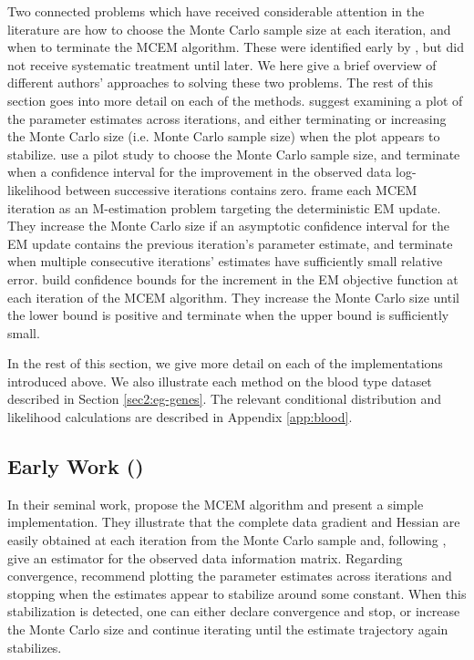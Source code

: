 \documentclass[11pt, oneside]{article}   	%
\begin{document}
Two connected problems which have received considerable attention in the literature are how to choose the Monte Carlo sample size at each iteration, and when to terminate the MCEM algorithm. These were identified early by \citet{Wei90}, but did not receive systematic treatment until later. We here give a brief overview of different authors' approaches to solving these two problems. The rest of this section goes into more detail on each of the methods. \citet{Wei90} suggest examining a plot of the parameter estimates across iterations, and either terminating or increasing the Monte Carlo size (i.e. Monte Carlo sample size) when the plot appears to stabilize. \citet{Cha95} use a pilot study to choose the Monte Carlo sample size, and terminate when a confidence interval for the improvement in the observed data log-likelihood between successive iterations contains zero. \citet{Boo99} frame each MCEM iteration as an M-estimation problem targeting the deterministic EM update. They increase the Monte Carlo size if an asymptotic confidence interval for the EM update contains the previous iteration's parameter estimate, and terminate when multiple consecutive iterations' estimates have sufficiently small relative error. \citet{Caf05} build confidence bounds for the increment in the EM objective function at each iteration of the MCEM algorithm. They increase the Monte Carlo size until the lower bound is positive and terminate when the upper bound is sufficiently small.

In the rest of this section, we give more detail on each of the implementations introduced above. We also illustrate each method on the blood type dataset described in Section \ref{sec2:eg-genes}. The relevant conditional distribution and likelihood calculations are described in Appendix \ref{app:blood}.

\subsection{Early Work (\citealp{Wei90})}

In their seminal work, \citet{Wei90} propose the MCEM algorithm and present a simple implementation. They illustrate that the complete data gradient and Hessian are easily obtained at each iteration from the Monte Carlo sample and, following \citet{Lou82}, give an estimator for the observed data information matrix. Regarding convergence, \citeauthor{Wei90} recommend plotting the parameter estimates across iterations and stopping when the estimates appear to stabilize around some constant. When this stabilization is detected, one can either declare convergence and stop, or increase the Monte Carlo size and continue iterating until the estimate trajectory again stabilizes.
\end{document}

